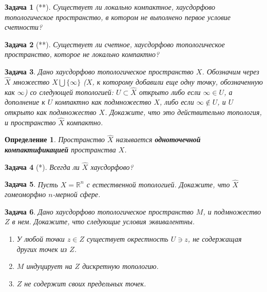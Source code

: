 \documentclass[12pt]{book}
\def\R{{\mathbb R}}
\theoremstyle{upshape}
\newtheorem{zadacha}{Задача}[chapter]
\theoremstyle{generic}
\newtheorem{opredelenie}[teorema]{Определение}
\theoremstyle{upshapenonumber}
\renewcommand{\labelenumi}{\ralph{enumi}.}
\newcommand{\следствие}{%
     \refstepcounter{teorema}
     {\noindent\bf Следствие \thechapter.\arabic{teorema}:\ }}
\newcommand{\пример}{%
     \refstepcounter{teorema}
     {\noindent\bf Пример \thechapter.\arabic{teorema}:\ }}
\newcommand{\лемма}{%
     \refstepcounter{teorema}
     {\noindent\bf Лемма \thechapter.\arabic{teorema}:\ }}
\newcommand{\теорема}{%
     \refstepcounter{teorema}
     {\noindent\bf Теорема \thechapter.\arabic{teorema}:\ }}
\newcommand{\утверждение}{%
     \refstepcounter{teorema}
     {\noindent\bf Утверждение \thechapter.\arabic{teorema}:\ }}
\begin{document}
{\begin{zadacha}[**]
Существует ли локально компактное, хаусдорфово топологическое
пространство, в котором не выполнено первое условие счетности?
\end{zadacha}

\begin{zadacha}[**]
Существует ли счетное, хаусдорфово топологическое
пространство, которое не локально компактно?
\end{zadacha}

\begin{zadacha}
Дано хаусдорфово 
топологическое пространство $X$. Обозначим через $\widehat{X}$
множество $X \bigcup \{\infty\}$ ($X$, к которому добавили еще одну
точку, обозначенную как $\infty$) 
со следующей топологией: $U \subset \widehat{X}$
открыто либо если $\infty \in U$, а дополнение
к $U$ компактно как подмножество $X$, либо если $\infty
\not\in U$, и $U$ открыто как подмножество $X$. 
Докажите, что это действительно топология, и
пространство $\widehat{X}$ компактно.
\end{zadacha}

\begin{opredelenie}
Пространство $\widehat{X}$ называется {\bf одноточечной
    компактификацией} пространства $X$.
\end{opredelenie}

\begin{zadacha}[*]
Всегда ли $\widehat{X}$ хаусдорфово?
\end{zadacha}

\begin{zadacha}
Пусть $X = \R^n$ с естественной топологией. Докажите, что
  $\widehat{X}$ гомеоморфно $n$-мерной сфере.
\end{zadacha}


\begin{zadacha}
\label{_DISKR_Opredelenie_Zadacha_}
Дано хаусдорфово топологическое пространство $M$, и подмножество
$Z$ в нем. Докажите, что следующие условия эквивалентны.
\begin{enumerate}
\renewcommand{\labelenumi}{(\roman{enumi})}
\item У любой точки $z\in Z$ существует окрестность
$U\ni z$, не содержащая других точек из $Z$.

\item $M$ индуцирует на $Z$ дискретную топологию.

\item $Z$ не содержит своих предельных точек.
\end{enumerate}
\end{zadacha}

}
\end{document}
